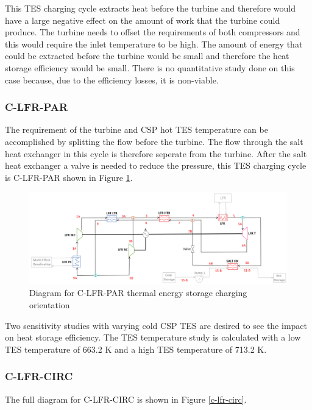 \begin{paracol}{2}
\linenumbers
\switchcolumn

This TES charging cycle extracts heat before the turbine and therefore would have a large negative effect on the amount of work that the turbine could produce. The turbine needs to offset the requirements of both compressors and this would require the inlet temperature to be high. The amount of energy that could be extracted before the turbine would be small and therefore the heat storage efficiency would be small. There is no quantitative study done on this case because, due to the efficiency losses, it is non-viable. 

\subsubsection{C-LFR-PAR} %

The requirement of the turbine and CSP hot TES temperature can be accomplished by splitting the flow before the turbine. The flow through the salt heat exchanger in this cycle is therefore seperate from the turbine. After the salt heat exchanger a valve is needed to reduce the pressure, this TES charging cycle is C-LFR-PAR shown in Figure \ref{c-lfr-par}.

\end{paracol}
\begin{figure}[H]
    \widefigure
    \includegraphics[width=\linewidth]{Definitions/c-lfr-par.pdf}
    \caption{Diagram for C-LFR-PAR thermal energy storage charging orientation\label{c-lfr-par}}
\end{figure}
\begin{paracol}{2}
\linenumbers
\switchcolumn

Two sensitivity studies with varying cold CSP TES are desired to see the impact on heat storage efficiency. The TES temperature study is calculated with a low TES temperature of 663.2 K and a high TES temperature of 713.2 K. 

\subsubsection{C-LFR-CIRC} %

The full diagram for C-LFR-CIRC is shown in Figure \ref{c-lfr-circ}.

\end{paracol}
